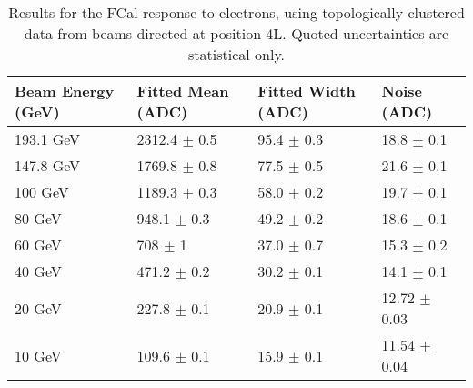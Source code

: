 \begin{table}[!htb]
\begin{center}
\begin{tabular}{|l|l|l|l|}
\hline
Beam Energy (GeV) & Fitted Mean (ADC)& Fitted Width (ADC)& Noise (ADC) \\
\hline
193.1 GeV  &  2312.4 $\pm$     0.5 &    95.4 $\pm$     0.3 &    18.8 $\pm$     0.1 \\
147.8 GeV  &  1769.8 $\pm$     0.8 &    77.5 $\pm$     0.5 &    21.6 $\pm$     0.1 \\
100 GeV  &  1189.3 $\pm$     0.3 &    58.0 $\pm$     0.2 &    19.7 $\pm$     0.1 \\
80 GeV  &   948.1 $\pm$     0.3 &    49.2 $\pm$     0.2 &    18.6 $\pm$     0.1 \\
60 GeV  &   708 $\pm$     1 &    37.0 $\pm$     0.7 &    15.3 $\pm$     0.2 \\
40 GeV  &   471.2 $\pm$     0.2 &    30.2 $\pm$     0.1 &    14.1 $\pm$     0.1 \\
20 GeV  &   227.8 $\pm$     0.1 &    20.9 $\pm$     0.1 &    12.72 $\pm$     0.03 \\
10 GeV  &   109.6 $\pm$     0.1 &    15.9 $\pm$     0.1 &    11.54 $\pm$     0.04 \\
\hline
\end{tabular}
\end{center}
\caption{Results for the FCal response to electrons, using topologically clustered data from beams directed at position 4L. Quoted uncertainties are statistical only.}
\label{table_electron_response_4L_t420}
\end{table}

